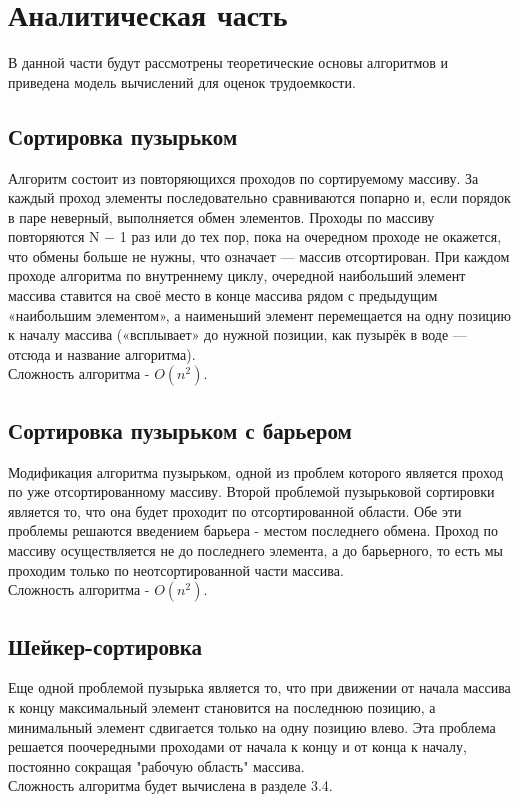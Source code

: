 \documentclass[a4paper, 14pt]{article}
\begin{document}
        \label{sec:intro}


    	\newpage
        \section{Аналитическая часть}

		\parindent=1cm
		В данной части будут рассмотрены теоретические основы алгоритмов и приведена модель вычислений для оценок трудоемкости.
		\subsection{Сортировка пузырьком}
		\parindent=1cm
Алгоритм состоит из повторяющихся проходов по сортируемому массиву. За каждый проход элементы последовательно сравниваются попарно и,
если порядок в паре неверный, выполняется обмен элементов. Проходы по
массиву повторяются N − 1 раз или до тех пор, пока на очередном проходе
не окажется, что обмены больше не нужны, что означает — массив отсортирован. При каждом проходе алгоритма по внутреннему циклу, очередной
наибольший элемент массива ставится на своё место в конце массива рядом
с предыдущим «наибольшим элементом», а наименьший элемент перемещается на одну позицию к началу массива («всплывает» до нужной позиции,
как пузырёк в воде — отсюда и название алгоритма).\\
		Сложность алгоритма - $O(n^2)$\cite{knut}.
		\subsection{Сортировка пузырьком с барьером}
		\parindent=1cm
		Модификация алгоритма пузырьком, одной из проблем которого является проход по уже отсортированному массиву.	Второй проблемой пузырьковой сортировки является то, что она будет проходит по отсортированной области. Обе эти проблемы решаются введением барьера - местом последнего обмена. Проход по массиву осуществляется не до последнего элемента, а до барьерного, то есть мы проходим только по неотсортированной части массива.\\
		Сложность алгоритма - $O(n^2)$\cite{knut}.
		\subsection{Шейкер-сортировка}
		\parindent=1cm
		Еще одной проблемой пузырька является то, что при движении от начала массива к концу максимальный элемент становится на последнюю позицию, а минимальный элемент сдвигается только на одну позицию влево. Эта проблема решается поочередными проходами от начала к концу и от конца к началу, постоянно сокращая "рабочую область" массива.\\
		Сложность алгоритма будет вычислена в разделе 3.4.
	
\end{document}
